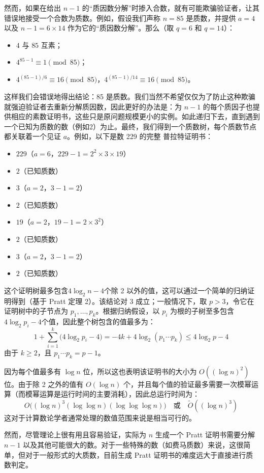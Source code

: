 然而，如果在给出 $n - 1$ 的“质因数分解”时掺入合数，就有可能欺骗验证者，让其错误地接受一个合数为质数。例如，假设我们声称 $n = 85$ 是质数，并提供 $a = 4$ 以及 $n - 1 = 6 \times 14$ 作为它的“质因数分解”。那么（取 $q = 6$ 和 $q = 14$）：
\begin{itemize}
\item $4$ 与 $85$ 互素；
\item $4^{85-1} \equiv 1 \pmod{85}$；
\item $4^{(85-1)/6} \equiv 16 \pmod{85}$，$4^{(85-1)/14} \equiv 16 \pmod{85}$。
\end{itemize}
这样我们会错误地得出结论：85 是质数。我们当然不希望仅仅为了防止这种欺骗就强迫验证者去重新分解质因数，因此更好的办法是：为 $n - 1$ 的每个质因子也提供相应的素数证明书，这些只是原问题规模更小的实例。如此递归下去，直到遇到一个已知为质数的数（例如2）为止。最终，我们得到一个质数树，每个质数节点都关联着一个见证 $a$。例如，以下是数 229 的完整 普拉特证明书：
\begin{itemize}
\item $229$（$a = 6$，$229 - 1 = 2^2 \times 3 \times 19$）
\item $2$（已知质数）
\item $3$（$a = 2$，$3 - 1 = 2$）
\item $2$（已知质数）
\item $19$（$a = 2$，$19 - 1 = 2 \times 3^2$）
\item $2$（已知质数）
\item $3$（$a = 2$，$3 - 1 = 2$）
\item $2$（已知质数）
\end{itemize}
这个证明树最多包含$4\log_{2}n - 4$个除 2 以外的值，这可以通过一个简单的归纳证明得到（基于 Pratt 定理 2）。该结论对 $3$ 成立；一般情况下，取 $p > 3$，令它在证明树中的子节点为 $p_1, \dots, p_k$。根据归纳假设，以 $p_i$ 为根的子树至多包含$
4\log_{2}p_i - 4$个值，因此整个树包含的值最多为：
$$
1 + \sum_{i=1}^{k} \big(4\log_{2}p_i - 4\big) = -4k + 4\log_{2}(p_1 \cdots p_k) \leq 4\log_{2}p - 4~
$$
由于 $k \ge 2$，且 $p_1 \cdots p_k = p - 1$。

因为每个值最多有 $\log n$ 位，所以这也表明该证明书的大小为 $O((\log n)^2)$ 位。由于除 2 之外的值有 $O(\log n)$ 个，并且每个值的验证最多需要一次模幂运算（而模幂运算是运行时间的主要消耗），因此总运行时间为：
$$
O\big((\log n)^3(\log \log n)(\log \log \log n)\big) \quad \text{或} \quad \tilde{O}((\log n)^3)~
$$
这对于计算数论学者通常处理的数值范围来说是相当可行的。

然而，尽管理论上很有用且容易验证，实际为 $n$ 生成一个 Pratt 证明书需要分解 $n - 1$ 以及其他可能很大的数。对于一些特殊的数（如费马质数）来说，这很简单，但对于一般形式的大质数，目前生成 Pratt 证明书的难度远大于直接进行质数判定。

